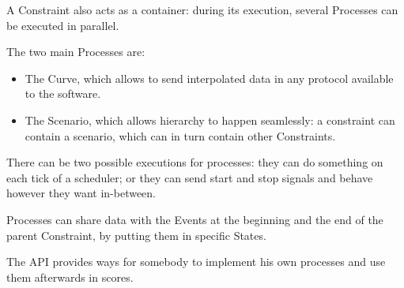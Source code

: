 \documentclass{article}
\begin{document}
	A Constraint also acts as a container: during its execution, several Processes can be executed in parallel.
	
	The two main Processes are:
	\begin{itemize}
		\item The Curve, which allows to send interpolated data in any protocol available to the software.
		\item The Scenario, which allows hierarchy to happen seamlessly: a constraint can contain a scenario, which can in turn contain other Constraints.
	\end{itemize}
	
	There can be two possible executions for processes: they can do something on each tick of a scheduler; or they can send start and stop signals and behave however they want in-between.
	
	Processes can share data with the Events at the beginning and the end of the parent Constraint, by putting them in specific States. 
	
	The API provides ways for somebody to implement his own processes and use them afterwards in scores.
\end{document}
